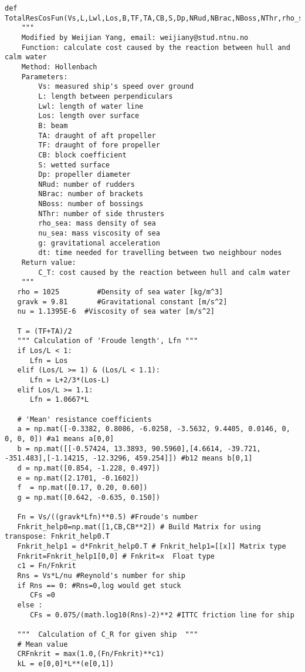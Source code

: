 \begin{lstlisting}[caption=Function for calculating cost caused by the reaction between hull and calm water(\autoref{Cost Hull}), label=calcosthull]
def TotalResCosFun(Vs,L,Lwl,Los,B,TF,TA,CB,S,Dp,NRud,NBrac,NBoss,NThr,rho_sea,nu_sea,g,dt):
    """     
    Modified by Weijian Yang, email: weijiany@stud.ntnu.no
    Function: calculate cost caused by the reaction between hull and calm water
    Method: Hollenbach
    Parameters:
        Vs: measured ship's speed over ground
        L: length between perpendiculars
        Lwl: length of water line
        Los: length over surface
        B: beam
        TA: draught of aft propeller
        TF: draught of fore propeller
        CB: block coefficient
        S: wetted surface
        Dp: propeller diameter
        NRud: number of rudders
        NBrac: number of brackets
        NBoss: number of bossings
        NThr: number of side thrusters
        rho_sea: mass density of sea
        nu_sea: mass viscosity of sea
        g: gravitational acceleration
        dt: time needed for travelling between two neighbour nodes
    Return value:
        C_T: cost caused by the reaction between hull and calm water
    """
   rho = 1025         #Density of sea water [kg/m^3]
   gravk = 9.81       #Gravitational constant [m/s^2]
   nu = 1.1395E-6  #Viscosity of sea water [m/s^2]

   T = (TF+TA)/2
   """ Calculation of 'Froude length', Lfn """ 
   if Los/L < 1:
      Lfn = Los
   elif (Los/L >= 1) & (Los/L < 1.1):
      Lfn = L+2/3*(Los-L)
   elif Los/L >= 1.1:
      Lfn = 1.0667*L

   # 'Mean' resistance coefficients
   a = np.mat([-0.3382, 0.8086, -6.0258, -3.5632, 9.4405, 0.0146, 0, 0, 0, 0]) #a1 means a[0,0]
   b = np.mat([[-0.57424, 13.3893, 90.5960],[4.6614, -39.721, -351.483],[-1.14215, -12.3296, 459.254]]) #b12 means b[0,1]
   d = np.mat([0.854, -1.228, 0.497])
   e = np.mat([2.1701, -0.1602])
   f  = np.mat([0.17, 0.20, 0.60])
   g = np.mat([0.642, -0.635, 0.150])

   Fn = Vs/((gravk*Lfn)**0.5) #Froude's number
   Fnkrit_help0=np.mat([1,CB,CB**2]) # Build Matrix for using transpose: Fnkrit_help0.T
   Fnkrit_help1 = d*Fnkrit_help0.T # Fnkrit_help1=[[x]] Matrix type
   Fnkrit=Fnkrit_help1[0,0] # Fnkrit=x  Float type
   c1 = Fn/Fnkrit
   Rns = Vs*L/nu #Reynold's number for ship
   if Rns == 0: #Rns=0,log would get stuck
      CFs =0
   else :
      CFs = 0.075/(math.log10(Rns)-2)**2 #ITTC friction line for ship

   """  Calculation of C_R for given ship  """ 
   # Mean value
   CRFnkrit = max(1.0,(Fn/Fnkrit)**c1)
   kL = e[0,0]*L**(e[0,1])


\end{lstlisting}
